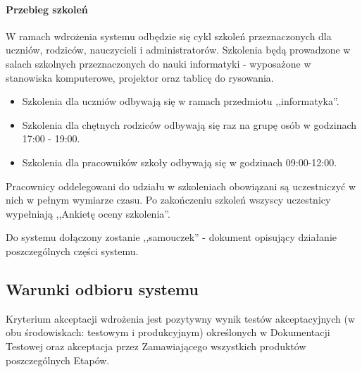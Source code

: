 \documentclass{article}
\begin{document}
\paragraph{Przebieg szkoleń}
W ramach wdrożenia systemu odbędzie się cykl szkoleń przeznaczonych dla uczniów, rodziców, nauczycieli i administratorów. Szkolenia będą prowadzone w salach szkolnych przeznaczonych do nauki informatyki - wyposażone w stanowiska komputerowe, projektor oraz tablicę do rysowania.
\begin{itemize}
\item Szkolenia dla uczniów odbywają się w ramach przedmiotu ,,informatyka''.
\item Szkolenia dla chętnych rodziców odbywają się raz na grupę osób w godzinach 17:00 - 19:00.
\item Szkolenia dla pracowników szkoły odbywają się w godzinach 09:00-12:00.
\end{itemize}
Pracownicy oddelegowani do udziału w szkoleniach obowiązani są uczestniczyć w nich w pełnym wymiarze czasu. Po zakończeniu szkoleń wszyscy uczestnicy wypełniają ,,Ankietę oceny szkolenia''.

Do systemu dołączony zostanie ,,samouczek'' - dokument opisujący działanie poszczególnych części systemu.

\subsection{Warunki odbioru systemu}
Kryterium akceptacji wdrożenia jest pozytywny wynik testów akceptacyjnych (w obu środowiskach: testowym i produkcyjnym) określonych w Dokumentacji Testowej oraz akceptacja przez Zamawiającego wszystkich produktów poszczególnych Etapów. 
\end{document}
